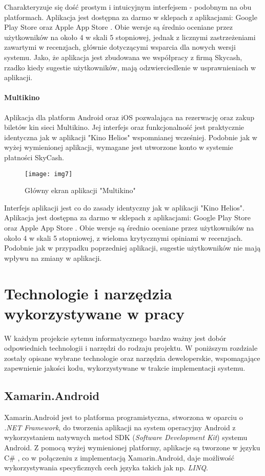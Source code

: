 Charakteryzuje się dość prostym i intuicyjnym interfejsem - podobnym na obu platformach. Aplikacja jest dostępna za darmo w sklepach z aplikacjami: Google Play Store  \cite{KinoHeli13:online} oraz Apple App Store \cite{Aplikacj38:online}. Obie wersje są średnio oceniane przez użytkowników na około 4 w skali 5 stopniowej, jednak z licznymi zastrzeżeniami zawartymi w recenzjach, głównie dotyczącymi wsparcia dla nowych wersji systemu. Jako, że aplikacja jest zbudowana we współpracy z firmą Skycash, rzadko kiedy sugestie użytkowników, mają odzwierciedlenie w usprawnieniach w aplikacji.
\newpage
\subsubsection*{Multikino}
Aplikacja dla platform Android oraz iOS pozwalająca na rezerwację oraz zakup biletów kin sieci Multikino. Jej interfejs oraz funkcjonalność jest praktycznie identyczna jak w aplikacji "Kino Helios" wspomnianej wcześniej. Podobnie jak w wyżej wymienionej aplikacji, wymagane jest utworzone konto w systemie płatności SkyCash.

\begin{figure}[h]
\centering
\texttt{[image: img7]}
\caption{Główny ekran aplikacji "Multikino"}
\end{figure}

\newpage
Interfejs aplikacji jest co do zasady identyczny jak w aplikacji "Kino Helios". Aplikacja jest dostępna za darmo w sklepach z aplikacjami: Google Play Store \cite{Multikin60:online} oraz Apple App Store \cite{Aplikacj40:online}. Obie wersje są średnio oceniane przez użytkowników na około 4 w skali 5 stopniowej, z wieloma krytycznymi opiniami w recenzjach. Podobnie jak w przypadku poprzedniej aplikacji, sugestie użytkowników nie mają wpływu na zmiany w aplikacji.
\chapter{Technologie i narzędzia wykorzystywane w pracy}
W każdym projekcie sytemu informatycznego bardzo ważny jest dobór odpowiednich technologii i narzędzi do rodzaju projektu. W poniższym rozdziale zostały opisane wybrane technologie oraz narzędzia deweloperskie, wspomagające zapewnienie jakości kodu, wykorzystywane w trakcie implementacji systemu.
\section{Xamarin.Android}
\label{sec:xamAnd}
Xamarin.Android jest to platforma programistyczna, stworzona w oparciu o \textit{.NET Framework}, do tworzenia aplikacji na system operacyjny Android z wykorzystaniem natywnych metod SDK (\textit{Software Development Kit}) systemu Android. Z pomocą wyżej wymienionej platformy, aplikacje są tworzone w języku C\# , co w połączeniu z implementacją Xamarin.Android, daje możliwość wykorzystywania specyficznych cech języka takich jak np. \textit{LINQ}. \cite{RefWorks:4}

